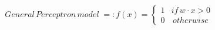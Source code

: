 \documentclass[10pt]{article} %
\begin{document}
\color{fgC}\[General\,Perceptron\,model\;=:f(x)=\left\{\begin{matrix}
1 & if \, w\cdot x > 0\\ 0 &\, otherwise \end{matrix}\right.\]
\end{document}
